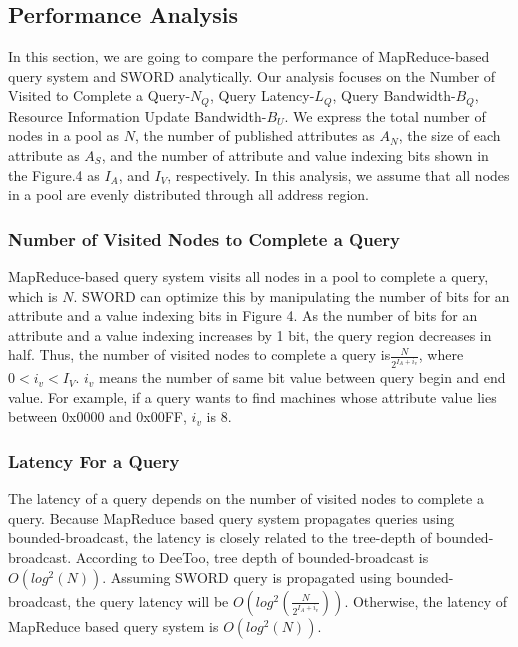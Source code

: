 \documentclass{acm_proc_article-sp}
\begin{document}
\subsection{Performance Analysis}
In this section, we are going to compare the performance of MapReduce-based query system and SWORD analytically. 
Our analysis focuses on the Number of Visited to Complete a Query-$N_Q$, Query Latency-$L_Q$, Query Bandwidth-$B_Q$, Resource Information Update Bandwidth-$B_U$.
We express the total number of nodes in a pool as $N$, the number of published attributes as $A_N$, the size of each attribute as $A_S$, 
and the number of attribute and value indexing bits shown in the Figure.4 as $I_A$, and $I_V$, respectively. In this analysis, we assume that all nodes in a pool are evenly distributed through all address region.

\subsubsection{Number of Visited Nodes to Complete a Query}
MapReduce-based query system visits all nodes in a pool to complete a query, which is $N$.
SWORD can optimize this by manipulating the number of bits for an attribute and a value indexing bits in Figure 4. As the number of bits for an attribute and a value indexing increases by 1 bit, 
the query region decreases in half. Thus, the number of visited nodes to complete a query is\begin{math}\frac{N}{2^{I_A+i_v}}\end{math}, where \begin{math}0<i_v<I_V\end{math}.
\begin{math}i_v\end{math} means the number of same bit value between query begin and end value. For example, if a query wants to find machines whose attribute value lies between 0x0000 and 0x00FF, \begin{math}i_v\end{math} is 8. 
\subsubsection{Latency For a Query}
The latency of a query depends on the number of visited nodes to complete a query. Because MapReduce based query system propagates queries using bounded-broadcast, the latency is closely related to
the tree-depth of bounded-broadcast. According to DeeToo\cite{deetoo}, tree depth of bounded-broadcast is \begin{math}O(log^2(N))\end{math}. Assuming SWORD query is propagated using bounded-broadcast,
the query latency will be  \begin{math}O(log^2(\frac{N}{2^{I_A+i_v}}))\end{math}. Otherwise, the latency of MapReduce based query system is  \begin{math}O(log^2(N))\end{math}.
\end{document}
